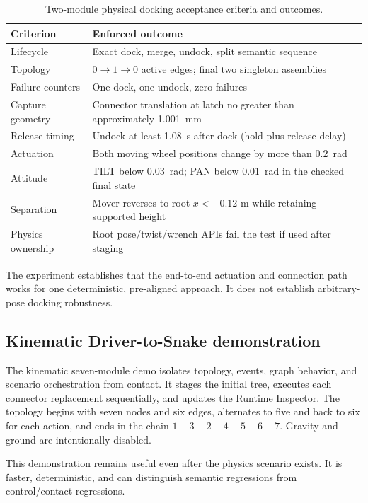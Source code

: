 \begin{table}[htbp]
\centering
\caption{Two-module physical docking acceptance criteria and outcomes.}
\label{tab:pair-results}
\begin{tabularx}{\textwidth}{L{0.38\textwidth}Y}
\toprule
Criterion & Enforced outcome \\
\midrule
Lifecycle & Exact dock, merge, undock, split semantic sequence \\
Topology & $0\rightarrow1\rightarrow0$ active edges; final two singleton assemblies \\
Failure counters & One dock, one undock, zero failures \\
Capture geometry & Connector translation at latch no greater than approximately \SI{1.001}{mm} \\
Release timing & Undock at least \SI{1.08}{s} after dock (hold plus release delay) \\
Actuation & Both moving wheel positions change by more than \SI{0.2}{rad} \\
Attitude & TILT below \SI{0.03}{rad}; PAN below \SI{0.01}{rad} in the checked final state \\
Separation & Mover reverses to root $x<-0.12$ m while retaining supported height \\
Physics ownership & Root pose/twist/wrench APIs fail the test if used after staging \\
\bottomrule
\end{tabularx}
\end{table}

The experiment establishes that the end-to-end actuation and connection path works for
one deterministic, pre-aligned approach. It does not establish arbitrary-pose docking
robustness.

\subsection{Kinematic Driver-to-Snake demonstration}

The kinematic seven-module demo isolates topology, events, graph behavior, and scenario
orchestration from contact. It stages the initial tree, executes each connector
replacement sequentially, and updates the Runtime Inspector. The topology begins with
seven nodes and six edges, alternates to five and back to six for each action, and ends
in the chain $1-3-2-4-5-6-7$. Gravity and ground are intentionally disabled.

This demonstration remains useful even after the physics scenario exists. It is faster,
deterministic, and can distinguish semantic regressions from control/contact regressions.

